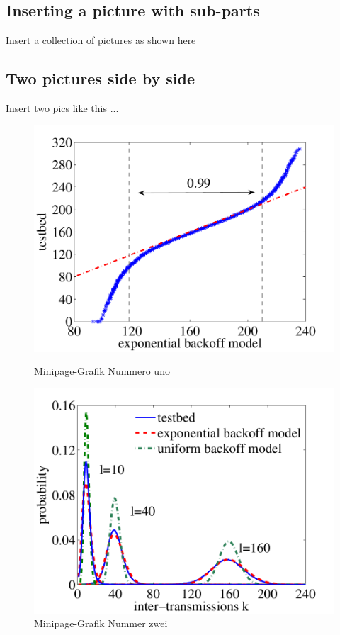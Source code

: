 \subsection{Inserting a picture with sub-parts}
\label{sec:chapter03:grafiken:subfloat}

Insert a collection of pictures as shown here




\subsection{Two pictures side by side}
\label{sec:chapter03:grafiken:minipage}
Insert two pics like this ...

\begin{figure}[htbp]
  \centering
  \begin{minipage}[b]{5 cm}
    \includegraphics[width=\linewidth]{4.graphics/figures/qq-plot_gaus_vs_160} 
    \caption{Minipage-Grafik Nummero uno}
    \label{fig:chapter03:minipage:grafik1}
  \end{minipage}
  \begin{minipage}[b]{5 cm}
    \includegraphics[width=\linewidth]{4.graphics/figures/pdf_gaus_vs_uni_vs_10_40_160}  
    \caption{Minipage-Grafik Nummer zwei}
    \label{fig:chapter03:minipage:grafik2}
  \end{minipage}
\end{figure}



